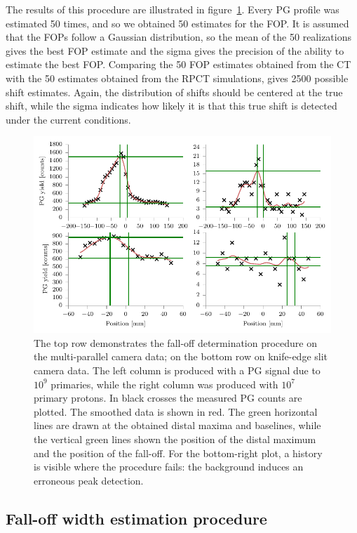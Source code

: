 \documentclass[a4paper,english]{article}
\begin{document}
The results of this procedure are illustrated in figure~\ref{fig:our-fit}. Every PG profile was estimated 50 times, and so we obtained 50 estimates for the FOP. It is assumed that the FOPs follow a Gaussian distribution, so the mean of the 50 realizations gives the best FOP estimate and the sigma gives the precision of the ability to estimate the best FOP. Comparing the 50 FOP estimates obtained from the CT with the 50 estimates obtained from the RPCT simulations, gives 2500 possible shift estimates. Again, the distribution of shifts should be centered at the true shift, while the sigma indicates how likely it is that this true shift is detected under the current conditions.

\begin{figure}[htp]
  \centering
  \includegraphics[width=0.9\linewidth]{fopproc}
  \caption{The top row demonstrates the fall-off determination procedure on the multi-parallel camera data; on the bottom row on knife-edge slit camera data. The left column is produced with a PG signal due to $10^9$ primaries, while the right column was produced with $10^7$ primary protons. In black crosses the measured PG counts are plotted. The smoothed data is shown in red. The green horizontal lines are drawn at the obtained distal maxima and baselines, while the vertical green lines shown the position of the distal maximum and the position of the fall-off. For the bottom-right plot, a history is visible where the procedure fails: the background induces an erroneous peak detection.}
  \label{fig:our-fit}
\end{figure}

\subsection{Fall-off width estimation procedure}
\end{document}

